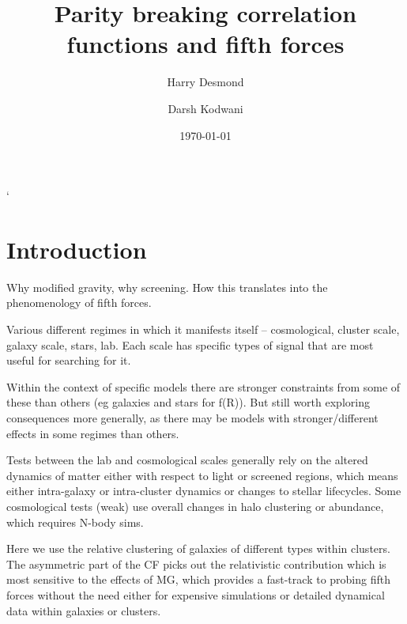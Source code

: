 \documentclass[aps,showpacs,onecolumn,floats,prd,superscriptaddress,nofootinbib]{revtex4-1}
\begin{document}
\title{\textbf{Parity breaking correlation functions and fifth forces}}

\author{Harry Desmond}
%

\author{Darsh Kodwani}
%

\date{\today}%
`
\begin{abstract}

\end{abstract}

\maketitle

\section{Introduction}

Why modified gravity, why screening. How this translates into the phenomenology of fifth forces.

Various different regimes in which it manifests itself -- cosmological, cluster scale, galaxy scale, stars, lab. Each scale has specific types of signal that are most useful for searching for it.

Within the context of specific models there are stronger constraints from some of these than others (eg galaxies and stars for f(R)). But still worth exploring consequences more generally, as there may be models with stronger/different effects in some regimes than others.

Tests between the lab and cosmological scales generally rely on the altered dynamics of matter either with respect to light or screened regions, which means either intra-galaxy or intra-cluster dynamics or changes to stellar lifecycles. Some cosmological tests (weak) use overall changes in halo clustering or abundance, which requires N-body sims.

Here we use the relative clustering of galaxies of different types within clusters. The asymmetric part of the CF picks out the relativistic contribution which is most sensitive to the effects of MG, which provides a fast-track to probing fifth forces without the need either for expensive simulations or detailed dynamical data within galaxies or clusters.
\end{document}
